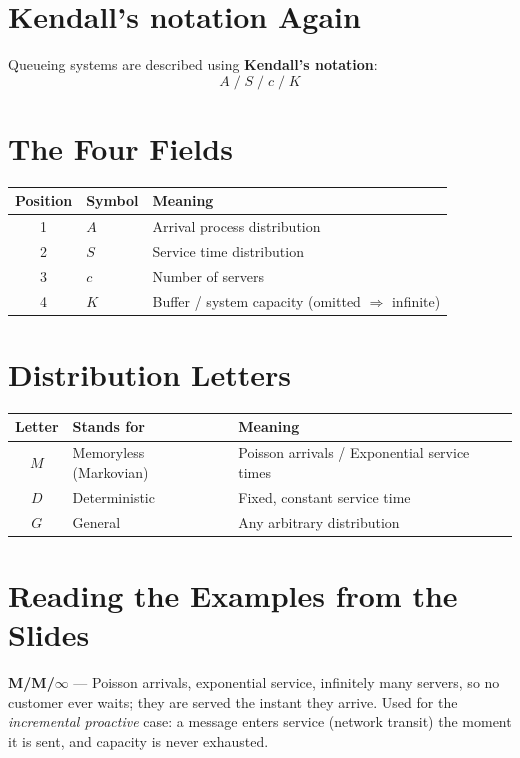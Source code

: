 \section{Kendall's notation Again}

Queueing systems are described using \textbf{Kendall's notation}:
\[
  A \;/\; S \;/\; c \;/\; K
\]
 
\section*{The Four Fields}
 
\begin{center}
\begin{tabular}{clp{8cm}}
  \toprule
  \textbf{Position} & \textbf{Symbol} & \textbf{Meaning} \\
  \midrule
  1 & $A$ & Arrival process distribution \\
  2 & $S$ & Service time distribution \\
  3 & $c$ & Number of servers \\
  4 & $K$ & Buffer / system capacity (omitted $\Rightarrow$ infinite) \\
  \bottomrule
\end{tabular}
\end{center}
 
\section*{Distribution Letters}
 
\begin{center}
\begin{tabular}{cll}
  \toprule
  \textbf{Letter} & \textbf{Stands for} & \textbf{Meaning} \\
  \midrule
  $M$ & Memoryless (Markovian) & Poisson arrivals / Exponential service times \\
  $D$ & Deterministic           & Fixed, constant service time \\
  $G$ & General                 & Any arbitrary distribution \\
  \bottomrule
\end{tabular}
\end{center}
 
\section*{Reading the Examples from the Slides}
 
\begin{insightbox}
\textbf{M/M/$\infty$} --- Poisson arrivals, exponential service, infinitely
many servers, so no customer ever waits; they are served the instant they
arrive. Used for the \emph{incremental proactive} case: a message enters
service (network transit) the moment it is sent, and capacity is never
exhausted.
\end{insightbox}
 
